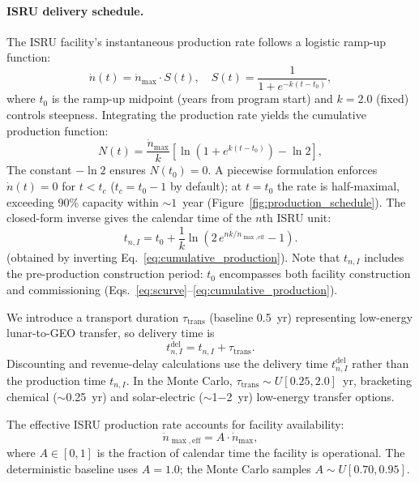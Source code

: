 \documentclass[preprint,12pt]{elsarticle}
\begin{document}
\paragraph{ISRU delivery schedule.} The ISRU facility's instantaneous production rate follows a logistic ramp-up function:
\begin{equation}
  \dot{n}(t) = \dot{n}_{\max} \cdot S(t), \quad S(t) = \frac{1}{1 + e^{-k(t - t_0)}},
  \label{eq:scurve}
\end{equation}
where $t_0$ is the ramp-up midpoint (years from program start) and $k = 2.0$ (fixed) controls steepness. Integrating the production rate yields the cumulative production function:
\begin{equation}
  N(t) = \frac{\dot{n}_{\max}}{k} \left[ \ln\!\left(1 + e^{k(t - t_0)}\right) - \ln 2 \right],
  \label{eq:cumulative_production}
\end{equation}
The constant $-\ln 2$ ensures $N(t_0) = 0$. A piecewise formulation enforces $\dot{n}(t) = 0$ for $t < t_c$ ($t_c = t_0 - 1$ by default); at $t = t_0$ the rate is half-maximal, exceeding 90\% capacity within ${\sim}1$~year (Figure~\ref{fig:production_schedule}). The closed-form inverse gives the calendar time of the $n$th ISRU unit:
\begin{equation}
  t_{n,I} = t_0 + \frac{1}{k} \ln\!\left(2\,e^{nk/\dot{n}_{\max,\mathrm{eff}}} - 1\right).
  \label{eq:production_schedule}
\end{equation}
(obtained by inverting Eq.~\ref{eq:cumulative_production}). Note that $t_{n,I}$ includes the pre-production construction period: $t_0$ encompasses both facility construction and commissioning (Eqs.~\ref{eq:scurve}--\ref{eq:cumulative_production}).

We introduce a transport duration $\tau_{\mathrm{trans}}$ (baseline 0.5~yr) representing low-energy lunar-to-GEO transfer, so delivery time is
\begin{equation}
  t_{n,I}^{\mathrm{del}} = t_{n,I} + \tau_{\mathrm{trans}}.
  \label{eq:delivery_time}
\end{equation}
Discounting and revenue-delay calculations use the delivery time $t_{n,I}^{\mathrm{del}}$ rather than the production time $t_{n,I}$. In the Monte Carlo, $\tau_{\mathrm{trans}} \sim U[0.25, 2.0]$~yr, bracketing chemical ($\sim$0.25~yr) and solar-electric ($\sim$1$-$2~yr) low-energy transfer options.

The effective ISRU production rate accounts for facility availability:
\begin{equation}
  \dot{n}_{\max,\mathrm{eff}} = A \cdot \dot{n}_{\max},
  \label{eq:availability}
\end{equation}
where $A \in [0,1]$ is the fraction of calendar time the facility is operational. The deterministic baseline uses $A = 1.0$; the Monte Carlo samples $A \sim U[0.70, 0.95]$.
\end{document}
